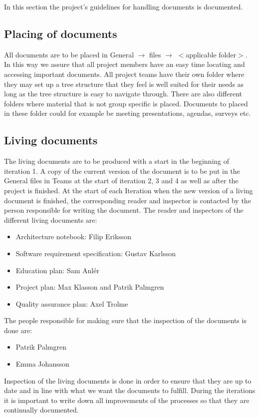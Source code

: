 In this section the project's guidelines for handling documents is documented. 

\subsection{Placing of documents} 
All documents are to be placed in General $\rightarrow$ files $\rightarrow$  \(<\)applicable folder\(>\). In this way we assure that all project members have an easy time locating and accessing important documents. All project teams have their own folder where they may set up a tree structure that they feel is well suited for their needs as long as the tree structure is easy to navigate through. There are also different folders where material that is not group specific is placed. Documents to placed in these folder could for example be meeting presentations, agendas, surveys etc. 

\subsection{Living documents} 
The living documents are to be produced with a start in the beginning of iteration 1. A copy of the current version of the document is to be put in the General files in Teams at the start of iteration 2, 3 and 4 as well as after the project is finished. At the start of each Iteration when the new version of a living document is finished, the corresponding reader and inspector is contacted by the person responsible for writing the document. The reader and inspectors of the different living documents are: 
\begin{itemize}
    \item Architecture notebook: Filip Eriksson
    \item Software requirement specification: Gustav Karlsson
    \item Education plan: Sam Anlér
    \item Project plan: Max Klasson and Patrik Palmgren
    \item Quality assurance plan: Axel Trolme 
\end{itemize}
The people responsible for making sure that the inspection of the documents is done are: 
\begin{itemize}
    \item Patrik Palmgren
    \item Emma Johansson
\end{itemize}
Inspection of the living documents is done in order to ensure that they are up to date and in line with what we want the documents to fulfill. During the iterations it is important to write down all improvements of the processes so that they are continually documented.

